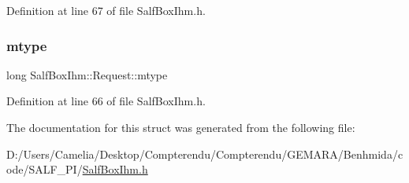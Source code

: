 Definition at line 67 of file Salf\+Box\+Ihm.\+h.

\mbox{\label{struct_salf_box_ihm_1_1_request_a1804201607b20e22ef55bb9439622c3d}} 
\subsubsection{\texorpdfstring{mtype}{mtype}}
{\footnotesize\ttfamily long Salf\+Box\+Ihm\+::\+Request\+::mtype}



Definition at line 66 of file Salf\+Box\+Ihm.\+h.



The documentation for this struct was generated from the following file\+:\begin{DoxyCompactItemize}
\item 
D\+:/\+Users/\+Camelia/\+Desktop/\+Compterendu/\+Compterendu/\+G\+E\+M\+A\+R\+A/\+Benhmida/code/\+S\+A\+L\+F\+\_\+\+P\+I/\hyperlink{_salf_box_ihm_8h}{Salf\+Box\+Ihm.\+h}\end{DoxyCompactItemize}
